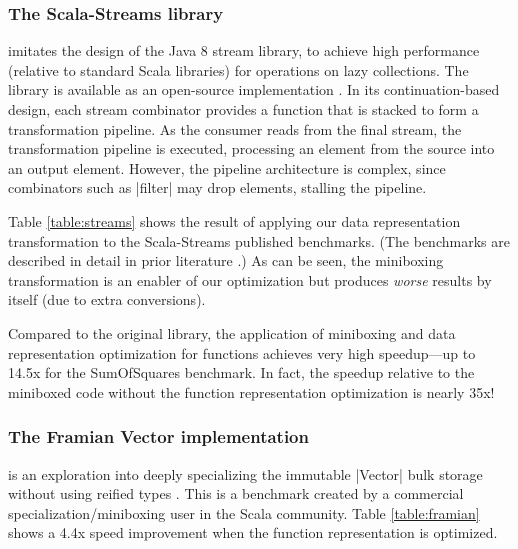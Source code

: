 \subsubsection{The Scala-Streams library} \cite{biboudis_clash_2014} imitates the design of the Java 8 stream library, to achieve high performance (relative to standard Scala libraries) for operations on lazy collections. The library is available as an open-source implementation \cite{biboudis-streams}. In its continuation-based design, each stream combinator provides a function that is stacked to form a transformation pipeline. As the consumer reads from the final stream, the transformation pipeline is executed, processing an element from the source into an output element. However, the pipeline architecture is complex, since combinators such as |filter| may drop elements, stalling the pipeline.

Table \ref{table:streams} shows the result of applying our data
representation transformation to the Scala-Streams published
benchmarks. (The benchmarks are described in detail in prior
literature \cite{biboudis_clash_2014}.) As can be seen, the miniboxing
transformation is an enabler of our optimization but produces
\emph{worse} results by itself (due to extra conversions). 

Compared to the original library, the application of miniboxing and
data representation optimization for functions achieves very high
speedup---up to 14.5x for the SumOfSquares benchmark. In fact, the
speedup relative to the miniboxed code without the function
representation optimization is nearly 35x!



\subsubsection{The Framian Vector implementation} is an exploration into deeply specializing the immutable |Vector| bulk storage without using reified types \cite{tixxit-respecialization15,tixxit-respecialization6}. This is a benchmark created by a commercial specialization/miniboxing user in the Scala community. Table \ref{table:framian} shows a 4.4x speed improvement when the function representation is optimized.

